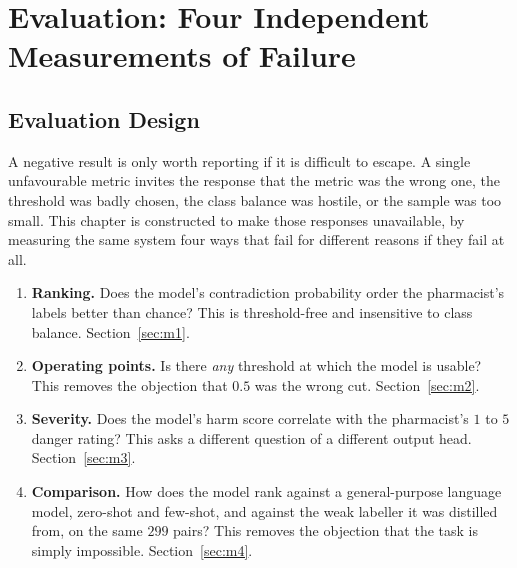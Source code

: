 %
%

\chapter{Evaluation: Four Independent Measurements of Failure}
\label{ch:eval}

\section{Evaluation Design}
\label{sec:eval-design}

A negative result is only worth reporting if it is difficult to escape. A single
unfavourable metric invites the response that the metric was the wrong one, the
threshold was badly chosen, the class balance was hostile, or the sample was too
small. This chapter is constructed to make those responses unavailable, by
measuring the same system four ways that fail for different reasons if they fail
at all.

\begin{enumerate}
\item \textbf{Ranking.} Does the model's contradiction probability order the
      pharmacist's labels better than chance? This is threshold-free and
      insensitive to class balance. Section~\ref{sec:m1}.
\item \textbf{Operating points.} Is there \emph{any} threshold at which the
      model is usable? This removes the objection that $0.5$ was the wrong
      cut. Section~\ref{sec:m2}.
\item \textbf{Severity.} Does the model's harm score correlate with the
      pharmacist's $1$ to $5$ danger rating? This asks a different question of a
      different output head. Section~\ref{sec:m3}.
\item \textbf{Comparison.} How does the model rank against a general-purpose
      language model, zero-shot and few-shot, and against the weak labeller it
      was distilled from, on the same $299$ pairs? This removes the objection
      that the task is simply impossible. Section~\ref{sec:m4}.
\end{enumerate}

